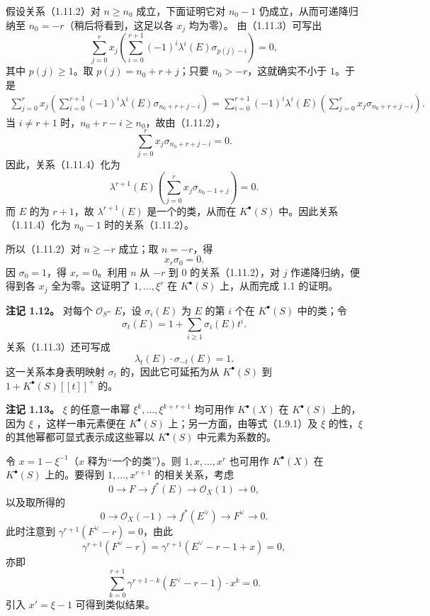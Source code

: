 假设关系（1.11.2）对 $n\geq n_0$ 成立，下面证明它对 $n_0-1$ 仍成立，从而可递降归纳至 $n_0=-r$（稍后将看到，这足以各 $x_j$ 均为零）。
由（1.11.3）可写出
\[
\sum_{j=0}^r x_j\left(\sum_{i=0}^{r+1}(-1)^i\lambda^i(E)\sigma_{p(j)-i}\right)=0,
\]
其中 $p(j)\geq1$。取 $p(j)=n_0+r+j$；只要 $n_0>-r$，这就确实不小于 $1$。于是
\[
\begin{aligned}
\sum_{j=0}^r x_j\left(\sum_{i=0}^{r+1}(-1)^i\lambda^i(E)\sigma_{n_0+r+j-i}\right)
=\sum_{i=0}^{r+1}(-1)^i\lambda^i(E)
\left(\sum_{j=0}^r x_j\sigma_{n_0+r+j-i}\right).
\end{aligned}
\]
当 $i\ne r+1$ 时，$n_0+r-i\geq n_0$，故由（1.11.2），
\[
\sum_{j=0}^r x_j\sigma_{n_0+r+j-i}=0.
\]
因此，关系（1.11.4）化为
\[
\lambda^{r+1}(E)\left(\sum_{j=0}^r x_j\sigma_{n_0-1+j}\right)=0.
\]
而 $E$ 的为 $r+1$，故 $\lambda^{r+1}(E)$ 是一个的类，从而在 $K^\bullet(S)$ 中。因此关系（1.11.4）化为 $n_0-1$ 时的关系（1.11.2）。

所以（1.11.2）对 $n\geq-r$ 成立；取 $n=-r$，得
\[
x_r\sigma_0=0.
\]
因 $\sigma_0=1$，得 $x_r=0$。利用 $n$ 从 $-r$ 到 $0$ 的关系（1.11.2），对 $j$ 作递降归纳，便得到各 $x_j$ 全为零。这证明了 $1,\ldots,\xi^r$ 在 $K^\bullet(S)$ 上，从而完成 1.1 的证明。

\textbf{注记 1.12。} 对每个 $\mathcal O_S$- $E$，设 $\sigma_i(E)$ 为 $E$ 的第 $i$ 个在 $K^\bullet(S)$ 中的类；令
\[
\sigma_t(E)=1+\sum_{i\geq1}\sigma_i(E)t^i.
\]
关系（1.11.3）还可写成
\[
\lambda_t(E)\cdot\sigma_{-t}(E)=1.\tag{1.12.1}
\]
这一关系本身表明映射 $\sigma_t$ 的，因此它可延拓为从 $K^\bullet(S)$ 到 $1+K^\bullet(S)[[t]]^+$ 的。

\textbf{注记 1.13。} $\xi$ 的任意一串幂 $\xi^k,\ldots,\xi^{k+r+1}$ 均可用作 $K^\bullet(X)$ 在 $K^\bullet(S)$ 上的，因为 $\xi$ ，这样一串元素便在 $K^\bullet(S)$ 上；另一方面，由等式（1.9.1）及 $\xi$ 的性，$\xi$ 的其他幂都可显式表示成这些幂以 $K^\bullet(S)$ 中元素为系数的。

令 $x=1-\xi^{-1}$（$x$ 释为“一个的类”）。则 $1,x,\ldots,x^r$ 也可用作 $K^\bullet(X)$ 在 $K^\bullet(S)$ 上的。要得到 $1,\ldots,x^{r+1}$ 的相关关系，考虑
\[
0\longrightarrow F\longrightarrow f^*(E)\longrightarrow\mathcal O_X(1)\longrightarrow0,
\]
以及取所得的
\[
0\longrightarrow\mathcal O_X(-1)\longrightarrow f^*(E^\vee)\longrightarrow F^\vee\longrightarrow0.
\]
此时注意到 $\gamma^{r+1}(F^\vee-r)=0$，由此
\[
\gamma^{r+1}(F^\vee-r)=\gamma^{r+1}(E^\vee-r-1+x)=0,
\]
亦即
\[
\sum_{k=0}^{r+1}\gamma^{r+1-k}(E^\vee-r-1)\cdot x^k=0.\tag{1.13.1}
\]
引入 $x'=\xi-1$ 可得到类似结果。


